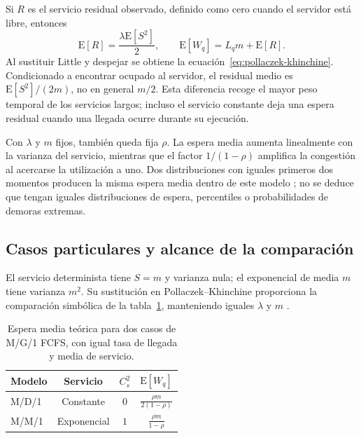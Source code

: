 Si $R$ es el servicio residual observado, definido como cero cuando el servidor está libre, entonces
\begin{equation}
  \mathrm{E}[R]=\frac{\lambda\mathrm{E}[S^2]}{2},
  \qquad
  \mathrm{E}[W_q]=L_q m+\mathrm{E}[R].
  \label{eq:servicio-residual}
\end{equation}
Al sustituir Little y despejar se obtiene la ecuación~\ref{eq:pollaczek-khinchine}. Condicionado a encontrar ocupado al servidor, el residual medio es $\mathrm{E}[S^2]/(2m)$, no en general $m/2$. Esta diferencia recoge el mayor peso temporal de los servicios largos; incluso el servicio constante deja una espera residual cuando una llegada ocurre durante su ejecución.

Con $\lambda$ y $m$ fijos, también queda fija $\rho$. La espera media aumenta linealmente con la varianza del servicio, mientras que el factor $1/(1-\rho)$ amplifica la congestión al acercarse la utilización a uno. Dos distribuciones con iguales primeros dos momentos producen la misma espera media dentro de este modelo \cite{virtamoMG1}; no se deduce que tengan iguales distribuciones de espera, percentiles o probabilidades de demoras extremas.

\subsection{Casos particulares y alcance de la comparación}
\label{subsec:comparacion-casos}

El servicio determinista tiene $S=m$ y varianza nula; el exponencial de media $m$ tiene varianza $m^2$. Su sustitución en Pollaczek--Khinchine proporciona la comparación simbólica de la tabla~\ref{tab:casos-servicio}, manteniendo iguales $\lambda$ y $m$ \cite{virtamoMG1}.

\begin{table}[htbp]
  \centering
  \caption{Espera media teórica para dos casos de M/G/1 FCFS, con igual tasa de llegada y media de servicio.}
  \label{tab:casos-servicio}
  \begin{tabular}{lccc}
    \hline
    Modelo & Servicio & $C_s^2$ & $\mathrm{E}[W_q]$ \\
    \hline
    M/D/1 & Constante & $0$ & $\displaystyle\frac{\rho m}{2(1-\rho)}$ \\[6pt]
    M/M/1 & Exponencial & $1$ & $\displaystyle\frac{\rho m}{1-\rho}$ \\[6pt]
    \hline
  \end{tabular}
\end{table}

